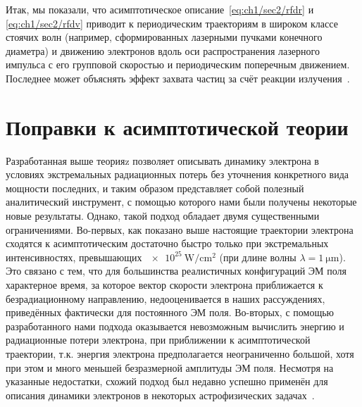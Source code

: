 Итак, мы показали, что асимптотическое описание~\eqref{eq:ch1/sec2/rfdr} и \eqref{eq:ch1/sec2/rfdv} приводит к периодическим траекториям в широком классе стоячих волн (например, сформированных лазерными пучками конечного диаметра) и движению электронов вдоль оси распространения лазерного импульса с его групповой скоростью и периодическим поперечным движением. Последнее может объяснять эффект захвата частиц за счёт реакции излучения~\cite{Ji14b}.


\section{Поправки к асимптотической теории}
\label{sec:ch1/sec4}

Разработанная выше теорияz позволяет описывать динамику электрона в условиях экстремальных радиационных потерь без уточнения конкретного вида мощности последних, и таким образом представляет собой полезный аналитический инструмент, с помощью которого нами были получены некоторые новые результаты.
Однако, такой подход обладает двумя существенными ограничениями.
Во-первых, как показано выше настоящие траектории электрона сходятся к асимптотическим достаточно быстро только при экстремальных интенсивностях, превышающих $\SI{e25}{\watt/\centi\meter^2}$ (при длине волны $\lambda=\SI{1}{\um}$).
Это связано с тем, что для большинства реалистичных конфигураций ЭМ поля характерное время, за которое вектор скорости электрона приближается к безрадиационному направлению, недооценивается в наших рассуждениях, приведённых фактически для постоянного ЭМ поля.
Во-вторых, с помощью разработанного нами подхода оказывается невозможным вычислить энергию и радиационные потери электрона, при приближении к асимптотической траектории, т.к. энергия электрона предполагается неограниченно большой, хотя при этом и много меньшей безразмерной амплитуды ЭМ поля.
Несмотря на указанные недостатки, схожий подход был недавно успешно применён для описания динамики электронов в некоторых астрофизических задачах~\cite{jerome2022particle}.

